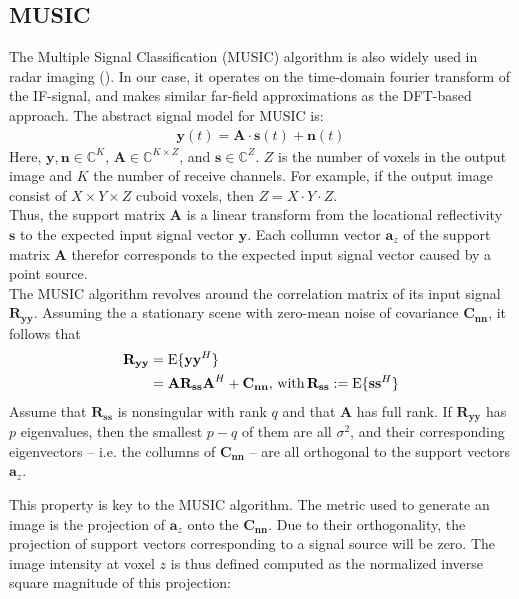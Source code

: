 \subsection{MUSIC}
The Multiple Signal Classification (MUSIC) algorithm \cite{music} is also widely used in radar imaging ().
In our case, it operates on the time-domain fourier transform of the IF-signal,
and makes similar far-field approximations as the DFT-based approach.
The abstract signal model for MUSIC is:
\begin{align}
    \mathbf y(t) = \mathbf A \cdot \mathbf s(t) + \mathbf n(t)
\end{align}
Here, $\mathbf y,\mathbf n \in \mathbb{C}^{K}$,
$\mathbf A \in \mathbb{C}^{K \times Z}$, and
$\mathbf s \in \mathbb{C}^{Z}$.
$Z$ is the number of voxels in the output image and $K$ the number of receive channels.
For example, if the output image consist of $X \times Y \times Z$ cuboid voxels, then $Z=X\cdot Y\cdot Z$. \\
Thus, the support matrix $\mathbf A$ is a linear transform from the locational reflectivity $\mathbf{s}$
to the expected input signal vector $\mathbf{y}$.
Each collumn vector $\mathbf a_z$ of the support matrix $\mathbf A$ therefor corresponds to the expected input signal vector caused by a point source. \\

The MUSIC algorithm revolves around the correlation matrix of its input signal $\mathbf{R_{yy}}$.
Assuming the a stationary scene with zero-mean noise of covariance $\mathbf{C_{nn}}$,
it follows that
\begin{align}
    \mathbf{R_{yy}} & = \text{E}\{\mathbf{yy}^H\}             \\
                    & =\mathbf{AR_{ss}A}^H + \mathbf{C_{nn}},
    \text{\,with\,} \mathbf{R_{ss}} := \text{E}\{\mathbf{ss}^H\}
\end{align}
Assume that $\mathbf{R_{ss}}$ is nonsingular with rank $q$ and that $\mathbf{A}$ has full rank.
If $\mathbf{R_{yy}}$ has $p$ eigenvalues, then the smallest $p-q$ of them are all $\sigma^2$,
and their corresponding eigenvectors -- i.e. the collumns of $\mathbf{C_{nn}}$ -- are all orthogonal to the support vectors $\mathbf a_z$.

This property is key to the MUSIC algorithm.
The metric used to generate an image is the projection of $\mathbf a_z$ onto the $\mathbf{C_{nn}}$.
Due to their orthogonality, the projection of support vectors corresponding to a signal source will be zero.
The image intensity at voxel $z$ is thus defined computed as the normalized inverse square magnitude of this projection:

